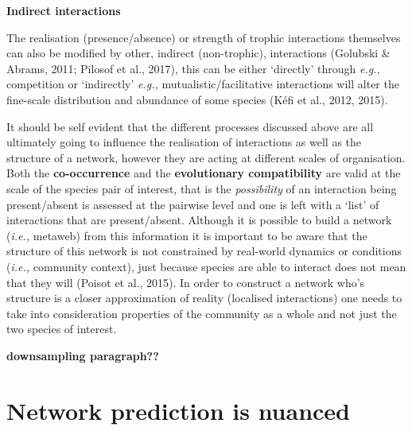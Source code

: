 \documentclass[
]{article}
\begin{document}
\textbf{Indirect interactions}

The realisation (presence/absence) or strength of trophic interactions
themselves can also be modified by other, indirect (non-trophic),
interactions (Golubski \& Abrams, 2011; Pilosof et al., 2017), this can
be either `directly' through \emph{e.g.,} competition or `indirectly'
\emph{e.g.,} mutualistic/facilitative interactions will alter the
fine-scale distribution and abundance of some species (Kéfi et al.,
2012, 2015).

It should be self evident that the different processes discussed above
are all ultimately going to influence the realisation of interactions as
well as the structure of a network, however they are acting at different
scales of organisation. Both the \textbf{co-occurrence} and the
\textbf{evolutionary compatibility} are valid at the scale of the
species pair of interest, that is the \emph{possibility} of an
interaction being present/absent is assessed at the pairwise level and
one is left with a `list' of interactions that are present/absent.
Although it is possible to build a network (\emph{i.e.,} metaweb) from
this information it is important to be aware that the structure of this
network is not constrained by real-world dynamics or conditions
(\emph{i.e.,} community context), just because species are able to
interact does not mean that they will (Poisot et al., 2015). In order to
construct a network who's structure is a closer approximation of reality
(localised interactions) one needs to take into consideration properties
of the community as a whole and not just the two species of interest.

\textbf{downsampling paragraph??}

\section{Network prediction is
nuanced}\label{network-prediction-is-nuanced}
\end{document}
